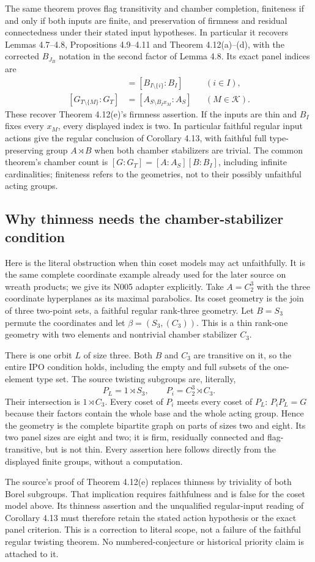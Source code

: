 The same theorem proves flag transitivity and chamber completion,
finiteness if and only if both inputs are finite, and preservation of
firmness and residual connectedness under their stated input
hypotheses. In particular it recovers Lemmas 4.7--4.8,
Propositions 4.9--4.11 and Theorem 4.12(a)--(d), with the corrected
$B_{J_B}$ notation in the second factor of Lemma 4.8. Its exact
panel indices are
\begin{align*}
 [G_{T\setminus\{i\}}:G_T]
   &=[B_{I\setminus\{i\}}:B_I] &&(i\in I),\\
 [G_{T\setminus\{M\}}:G_T]
   &=[A_{S\setminus B_Ix_M}:A_S] &&(M\in\mathcal K).
\end{align*}
These recover Theorem 4.12(e)'s firmness assertion. If the inputs are
thin and $B_I$ fixes every $x_M$, every displayed index is two.
In particular faithful regular input actions give the regular
conclusion of Corollary 4.13, with faithful full type-preserving
group $A\rtimes B$ when both chamber stabilizers are trivial.
The common theorem's chamber count is
$[G:G_T]=[A:A_S][B:B_I]$, including infinite cardinalities;
finiteness refers to the geometries, not to their possibly
unfaithful acting groups.

\subsection{Why thinness needs the chamber-stabilizer condition}
Here is the literal obstruction when thin coset models may act
unfaithfully. It is the same complete coordinate example already
used for the later source on wreath products; we give its N005
adapter explicitly. Take $A=C_2^3$ with the three coordinate
hyperplanes as its maximal parabolics. Its coset geometry is the
join of three two-point sets, a faithful regular rank-three geometry.
Let $B=S_3$ permute the coordinates and let
$\beta=(S_3,(C_3))$. This is a thin rank-one geometry with two
elements and nontrivial chamber stabilizer $C_3$.

There is one orbit $L$ of size three. Both $B$ and $C_3$ are
transitive on it, so the entire IPO condition holds, including the
empty and full subsets of the one-element type set. The source
twisting subgroups are, literally,
\[
 P_L=1\rtimes S_3,
 \qquad P_i=C_2^3\rtimes C_3.
\]
Their intersection is $1\rtimes C_3$. Every coset of $P_i$ meets
every coset of $P_L$: $P_iP_L=G$ because their factors contain the
whole base and the whole acting group. Hence the geometry is the
complete bipartite graph on parts of sizes two and eight. Its two
panel sizes are eight and two; it is firm, residually connected and
flag-transitive, but is not thin. Every assertion here follows
directly from the displayed finite groups, without a computation.

The source's proof of Theorem 4.12(e) replaces thinness by triviality
of both Borel subgroups. That implication requires faithfulness and
is false for the coset model above. Its thinness assertion and the
unqualified regular-input reading of Corollary 4.13 must therefore
retain the stated action hypothesis or the exact panel criterion.
This is a correction to literal scope, not a failure of the faithful
regular twisting theorem. No numbered-conjecture or historical
priority claim is attached to it.
